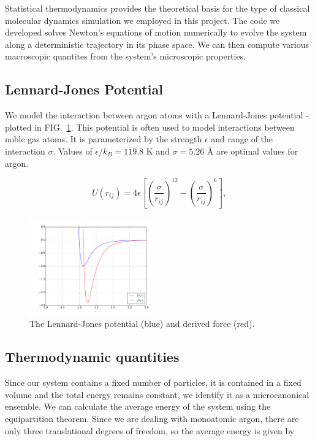 \documentclass[10pt,showpacs,preprintnumbers,footinbib,amsmath,amssymb,aps,prl,twocolumn,groupedaddress,superscriptaddress,showkeys]{revtex4-1}
\begin{document}
Statistical thermodynamics provides the theoretical basis for the type
of classical molecular dynamics simulation we employed in this project.
The code we developed solves Newton's equations of motion
numerically to evolve the system along a deterministic trajectory in
its phase space. We can then compute various macroscopic quantites
from the system's microscopic properties.

\subsection*{Lennard-Jones Potential}

We model the interaction between argon atoms with a Lennard-Jones
potential - plotted in
FIG.~\ref{fig:lj}. This potential is often used to model interactions
between noble gas atoms. It is parameterized by the strength
$\epsilon$ and range of the interaction $\sigma$. Values of
$\epsilon / k_B = 119.8$ K and $\sigma = 5.26$ {\AA} are
optimal values for argon.


\begin{equation}
	U(r_{ij}) = 4\epsilon\left[\left(\frac{\sigma}{r_{ij}}\right)^{12} - \left(\frac{\sigma}{r_{ij}}\right)^6\right],
	\label{eq:lj}
\end{equation}

\begin{figure}
	\centering
	\includegraphics[width=0.5\textwidth]{figures/LJ.pdf}
	\caption{The Lennard-Jones potential (blue) and derived force (red).}
	\label{fig:lj}
\end{figure}

\subsection*{Thermodynamic quantities}

Since our system contains a fixed number of particles, it is contained
in a fixed volume and the total energy remains constant, we identify
it as a microcanonical ensemble. We can calculate the average energy
of the system using the equipartition theorem. Since we are dealing
with monoatomic argon, there are only three translational degrees of
freedom, so the average energy is given by
\end{document}
